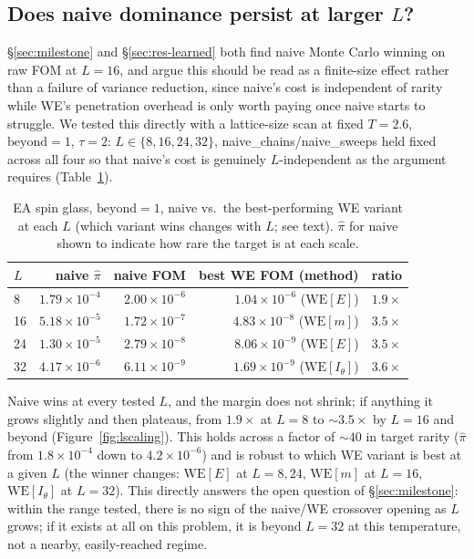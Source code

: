 \documentclass[a4paper,fleqn]{cas-sc}
\let\Oldsubsection\subsection
\renewcommand{\subsection}{\FloatBarrier\Oldsubsection}
\begin{document}
\subsection{Does naive dominance persist at larger $L$?}\label{sec:lscaling}
\S\ref{sec:milestone} and \S\ref{sec:res-learned} both find naive Monte Carlo winning on
raw FOM at $L=16$, and argue this should be read as a finite-size effect rather than a
failure of variance reduction, since naive's cost is independent of rarity while WE's
penetration overhead is only worth paying once naive starts to struggle. We tested this
directly with a lattice-size scan at fixed $T=2.6$, $\mathrm{beyond}=1$, $\tau=2$: $L\in
\{8,16,24,32\}$, naive\_chains/naive\_sweeps held fixed across all four so that naive's
cost is genuinely $L$-independent as the argument requires (Table~\ref{tab:lscaling}).

\begin{table}[H]
\centering\small
\caption{EA spin glass, $\mathrm{beyond}=1$, naive vs.\ the best-performing WE variant at
	each $L$ (which variant wins changes with $L$; see text). $\hat\pi$ for naive shown to
	indicate how rare the target is at each scale.}
\label{tab:lscaling}
\begin{tabular}{lrrrr}
	\toprule
	$L$ & naive $\hat\pi$ & naive FOM & best WE FOM (method) & ratio \\
	\midrule
	8 & $1.79\times10^{-4}$ & $2.00\times10^{-6}$ & $1.04\times10^{-6}$ ($\mathrm{WE}[E]$) & $1.9\times$ \\
	16 & $5.18\times10^{-5}$ & $1.72\times10^{-7}$ & $4.83\times10^{-8}$ ($\mathrm{WE}[m]$) & $3.5\times$ \\
	24 & $1.30\times10^{-5}$ & $2.79\times10^{-8}$ & $8.06\times10^{-9}$ ($\mathrm{WE}[E]$) & $3.5\times$ \\
	32 & $4.17\times10^{-6}$ & $6.11\times10^{-9}$ & $1.69\times10^{-9}$ ($\mathrm{WE}[I_\theta]$) & $3.6\times$ \\
	\bottomrule
\end{tabular}
\end{table}

Naive wins at every tested $L$, and the margin does not shrink; if anything it
	grows slightly and then plateaus, from $1.9\times$ at $L=8$ to $\sim\!3.5\times$ by
	$L=16$ and beyond (Figure~\ref{fig:lscaling}). This holds across a factor of ${\sim}40$ in target rarity
($\hat\pi$ from $1.8\times10^{-4}$ down to $4.2\times10^{-6}$) and is robust to which WE
variant is best at a given $L$ (the winner changes: $\mathrm{WE}[E]$ at $L=8,24$,
$\mathrm{WE}[m]$ at $L=16$, $\mathrm{WE}[I_\theta]$ at $L=32$). This directly answers the
open question of \S\ref{sec:milestone}: within the range tested, there is no sign
	of the naive/WE crossover opening as $L$ grows; if it exists at all on this problem, it is
beyond $L=32$ at this temperature, not a nearby, easily-reached regime.
\end{document}
